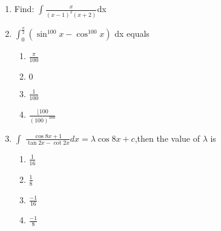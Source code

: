 \begin{enumerate}
\item Find:
$\int {\frac{x}{(x-1)^2(x+2)}} $dx
      
\item  $\int_{0}^{\frac{\pi}{2}} (\sin^{100} x-\cos^{100} x)$ dx equals
\begin{enumerate}
\item  ${\frac{\pi}{100}}$
\item $0$
\item ${\frac{1}{100}}$
\item  ${\frac{\lfloor 100} {(100)^{100}}}$ 
\end{enumerate}

\item $\int$ ${\frac{\cos 8x+1}{\tan 2x- \cot 2x}} dx= \lambda \cos 8x+c $,then the value of $\lambda$  is
\begin{enumerate}
\item  ${\frac{1}{16}}$
\item  ${\frac{1}{8}}$
\item  ${\frac{-1}{16}}$
\item  ${\frac{-1}{8}}$
\end{enumerate}

\end{enumerate}
